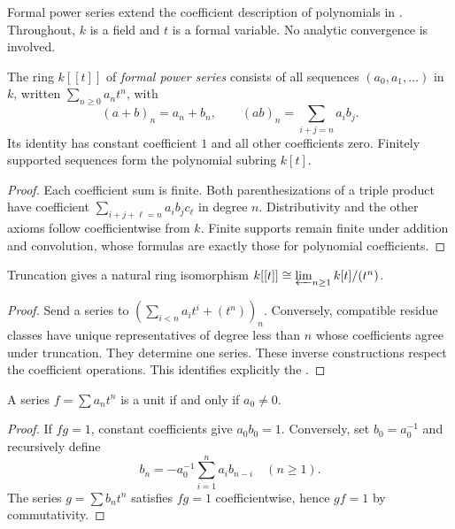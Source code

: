 Formal power series extend the coefficient description of polynomials in
. Throughout, $k$ is a field
and $t$ is a formal variable. No analytic convergence is involved.

\begin{definition}\label{formal-series}
The ring $k[[t]]$ of \emph{formal power series} consists of all sequences
$(a_0,a_1,\ldots)$ in $k$, written $\sum_{n\ge0}a_nt^n$, with
\[
 (a+b)_n=a_n+b_n,\qquad (ab)_n=\sum_{i+j=n}a_ib_j.
\]
Its identity has constant coefficient $1$ and all other coefficients zero.
Finitely supported sequences form the polynomial subring $k[t]$.
\end{definition}
\begin{proof}\label{series-ring-proof}
Each coefficient sum is finite. Both parenthesizations of a triple product
have coefficient $\sum_{i+j+\ell=n}a_ib_jc_\ell$ in degree $n$.
Distributivity and the other axioms follow coefficientwise from $k$.
Finite supports remain finite under addition and convolution, whose
formulas are exactly those for polynomial coefficients.
\end{proof}

\begin{proposition}\label{series-completion}
Truncation gives a natural ring isomorphism
$k[[t]]\cong\varprojlim_{n\ge1}k[t]/(t^n)$.
\end{proposition}
\begin{proof}\label{series-completion-proof}
Send a series to $(\sum_{i<n}a_it^i+(t^n))_n$. Conversely, compatible
residue classes have unique representatives of degree less than $n$
whose coefficients agree under truncation. They determine one series.
These inverse constructions respect the coefficient operations. This
identifies explicitly the .
\end{proof}

\begin{theorem}\label{series-units}
A series $f=\sum a_nt^n$ is a unit if and only if $a_0\ne0$.
\end{theorem}
\begin{proof}\label{series-units-proof}
If $fg=1$, constant coefficients give $a_0b_0=1$.
Conversely, set $b_0=a_0^{-1}$ and recursively define
\[
 b_n=-a_0^{-1}\sum_{i=1}^n a_ib_{n-i}\quad(n\ge1).
\]
The series $g=\sum b_nt^n$ satisfies $fg=1$ coefficientwise, hence
$gf=1$ by commutativity.
\end{proof}

